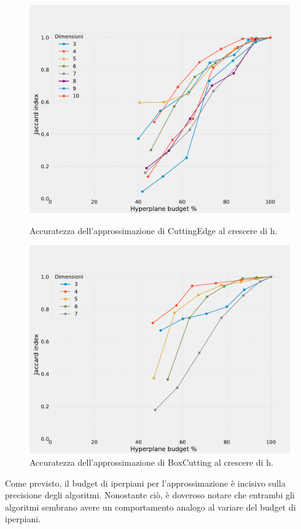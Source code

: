 \begin{figure}[H]
    \centering
    \begin{minipage}[b]{0.45\textwidth}
        \centering
        \includegraphics[width=\textwidth]{media/report_ndim/ndim_accuracy_diff_CE.pdf}
        \caption{Accuratezza dell'approssimazione di CuttingEdge al crescere di h.}
        \label{fig: acc_ce}
    \end{minipage}
    \hspace{0.05\textwidth}  %
    \begin{minipage}[b]{0.45\textwidth}
        \centering
        \includegraphics[width=\textwidth]{media/report_ndim/ndim_accuracy_diff_BC.pdf}
        \caption{Accuratezza dell'approssimazione di BoxCutting al crescere di h.}
        \label{fig: acc_bc}
    \end{minipage}
\end{figure}
Come previsto, il budget di iperpiani per l'approssimazione è incisivo sulla precisione
degli algoritmi. Nonostante ciò, è doveroso notare che entrambi gli algoritmi sembrano
avere un comportamento analogo al variare del budget di iperpiani.\\

